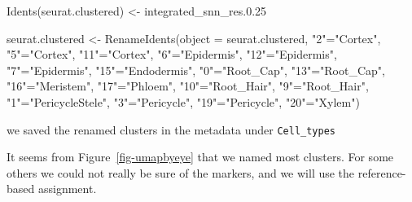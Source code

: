 \documentclass[
  letterpaper,
  DIV=11,
  numbers=noendperiod]{scrartcl}
\newenvironment{Shaded}{\begin{snugshade}}{\end{snugshade}}
\newcommand{\AttributeTok}[1]{\textcolor[rgb]{0.40,0.45,0.13}{#1}}
\newcommand{\FunctionTok}[1]{\textcolor[rgb]{0.28,0.35,0.67}{#1}}
\newcommand{\NormalTok}[1]{\textcolor[rgb]{0.00,0.23,0.31}{#1}}
\newcommand{\OtherTok}[1]{\textcolor[rgb]{0.00,0.23,0.31}{#1}}
\newcommand{\SpecialCharTok}[1]{\textcolor[rgb]{0.37,0.37,0.37}{#1}}
\newcommand{\StringTok}[1]{\textcolor[rgb]{0.13,0.47,0.30}{#1}}
\begin{document}
\begin{Shaded}
\begin{Highlighting}[]
\FunctionTok{Idents}\NormalTok{(seurat.clustered) }\OtherTok{\textless{}{-}} \StringTok{\textquotesingle{}integrated\_snn\_res.0.25\textquotesingle{}}

\NormalTok{seurat.clustered }\OtherTok{\textless{}{-}} \FunctionTok{RenameIdents}\NormalTok{(}\AttributeTok{object =}\NormalTok{ seurat.clustered,}
                               \StringTok{"2"}\OtherTok{=}\StringTok{"Cortex"}\NormalTok{, }\StringTok{"5"}\OtherTok{=}\StringTok{"Cortex"}\NormalTok{, }\StringTok{"11"}\OtherTok{=}\StringTok{"Cortex"}\NormalTok{,}
                               \StringTok{"6"}\OtherTok{=}\StringTok{"Epidermis"}\NormalTok{, }\StringTok{"12"}\OtherTok{=}\StringTok{"Epidermis"}\NormalTok{, }\StringTok{"7"}\OtherTok{=}\StringTok{"Epidermis"}\NormalTok{,}
                               \StringTok{"15"}\OtherTok{=}\StringTok{"Endodermis"}\NormalTok{,  }
                               \StringTok{"0"}\OtherTok{=}\StringTok{"Root\_Cap"}\NormalTok{, }\StringTok{"13"}\OtherTok{=}\StringTok{"Root\_Cap"}\NormalTok{,}
                               \StringTok{"16"}\OtherTok{=}\StringTok{"Meristem"}\NormalTok{,  }
                               \StringTok{"17"}\OtherTok{=}\StringTok{"Phloem"}\NormalTok{,}
                               \StringTok{"10"}\OtherTok{=}\StringTok{"Root\_Hair"}\NormalTok{, }\StringTok{"9"}\OtherTok{=}\StringTok{"Root\_Hair"}\NormalTok{,}
                               \StringTok{"1"}\OtherTok{=}\StringTok{"PericycleStele"}\NormalTok{, }
                               \StringTok{"3"}\OtherTok{=}\StringTok{"Pericycle"}\NormalTok{, }\StringTok{"19"}\OtherTok{=}\StringTok{"Pericycle"}\NormalTok{,}
                               \StringTok{"20"}\OtherTok{=}\StringTok{"Xylem"}\NormalTok{)}
\end{Highlighting}
\end{Shaded}

we saved the renamed clusters in the metadata under \texttt{Cell\_types}

\begin{Shaded}
\end{Shaded}

It seems from Figure~\ref{fig-umapbyeye} that we named most clusters.
For some others we could not really be sure of the markers, and we will
use the reference-based assignment.
\end{document}
